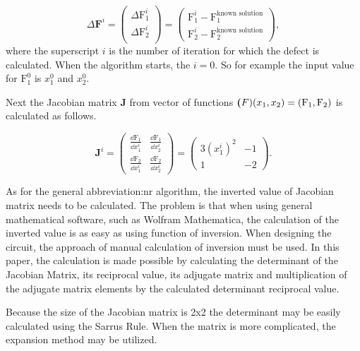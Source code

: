 \documentclass[a4paper, twoside, 11pt]{article}
\begin{document}
        \begin{equation}
            \Delta \textbf{F}^i =
            \begin{pmatrix}
                \Delta \text{F}_1^i\\
                \Delta \text{F}_2^i\\
            \end{pmatrix}
            =
            \begin{pmatrix}
                \text{F}_1^i - \text{F}_1^{\text{known solution}}\\
                \text{F}_2^i - \text{F}_2^{\text{known solution}}
            \end{pmatrix},
        \end{equation}
        where the superscript $i$ is the number of iteration for which the defect is calculated. When the algorithm starts, the $i = 0$. So for example the input value for $\text{F}_1^0$ is $x_1^0$ and $x_2^0$.\par
        Next the Jacobian matrix \textbf{J} from vector of functions $\textbf(F)(x_1, x_2) = (\text{F}_1, \text{F}_2)$ is calculated as follows.

    \begin{equation}
        \textbf{J}^i = 
        \begin{pmatrix}
            \frac{\dd \text{F}_1}{\dd x_1^i} & \frac{\dd \text{F}_1}{\dd x_2^i}\\
            \frac{\dd \text{F}_2}{\dd x_1^i} & \frac{\dd \text{F}_2}{\dd x_2^i}
        \end{pmatrix}
        =
        \begin{pmatrix}
            3 (x_1^i)^2 & -1\\
            1 & -2
        \end{pmatrix}.
    \end{equation}

    As for the general \gls{abbreviation:nr} algorithm, the inverted value of Jacobian matrix needs to be calculated. The problem is that when using general mathematical software, such as Wolfram Mathematica, the calculation of the inverted value is as easy as using function of inversion. When designing the circuit, the approach of manual calculation of inversion must be used. In this paper, the calculation is made possible by calculating the determinant of the Jacobian Matrix, its reciprocal value, its adjugate matrix and multiplication of the adjugate matrix elements by the calculated determinant reciprocal value.\par
    Because the size of the Jacobian matrix is 2x2 the determinant may be easily calculated using the Sarrus Rule. When the matrix is more complicated, the expansion method may be utilized.
\end{document}
